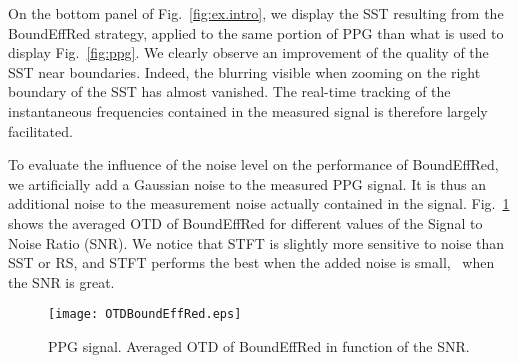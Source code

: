 On the bottom panel of Fig.~\ref{fig:ex.intro}, we display the SST resulting from the {\sf BoundEffRed} strategy, applied to the same portion of PPG than what is used to display Fig.~\ref{fig:ppg}. We clearly observe an improvement of the quality of the SST near boundaries. Indeed, the blurring visible when zooming on the right boundary of the SST has almost vanished. The real-time tracking of the instantaneous frequencies contained in the measured signal is therefore largely facilitated.



To evaluate the influence of the noise level on the performance of {\sf BoundEffRed}, we artificially add a Gaussian noise to the measured PPG signal. It is thus an additional noise to the measurement noise actually contained in the signal. Fig.~\ref{fig:otd.noise} shows the averaged OTD of {\sf BoundEffRed} for different values of the Signal to Noise Ratio (SNR). We notice that STFT is slightly more sensitive to noise than SST or RS, and STFT performs the best when the added noise is small, \ie~when the SNR is great. %


\begin{figure}
\centering
\texttt{[image: OTDBoundEffRed.eps]}
\caption{PPG signal. Averaged OTD of {\sf BoundEffRed} in function of the SNR.}
\label{fig:otd.noise}
\end{figure} 